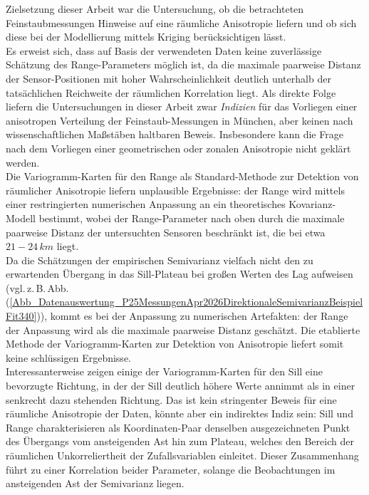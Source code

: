 \label{KapitelDatenauswertung_Diskussion}
Zielsetzung dieser Arbeit war die Untersuchung, ob die betrachteten
Feinstaubmessungen Hinweise auf eine räumliche Anisotropie 
liefern und ob sich diese bei der Modellierung mittels Kriging
berücksichtigen lässt.\\

Es erweist sich, dass auf Basis der verwendeten Daten keine
zuverlässige Schätzung des Range-Parameters möglich ist, da 
die maximale paarweise Distanz der Sensor-Positionen mit hoher
 Wahrscheinlichkeit deutlich unterhalb der tatsächlichen
Reichweite der räum\-li\-chen Korrelation liegt. Als direkte
Folge liefern die Untersuchungen in dieser Arbeit zwar
\textit{Indizien} für das Vorliegen einer anisotropen
Verteilung der Feinstaub-Messungen in München, aber keinen 
nach wissenschaftlichen Maßstäben haltbaren Beweis.
Insbesondere kann die Frage nach dem Vorliegen einer 
 geometrischen oder zonalen Anisotropie nicht geklärt 
 werden. \\

Die Variogramm-Karten für den Range als 
Standard-Methode zur Detektion von räum\-li\-cher Anisotropie 
liefern unplausible Ergebnisse:
der Range wird mittels einer restringierten 
numerischen Anpassung an ein theoretisches 
Kovarianz-Modell bestimmt, wobei der Range-Parameter nach oben 
durch die maximale paarweise Distanz der untersuchten
Sensoren beschränkt ist, die bei etwa $21-24\,k m$ liegt.\\
Da die Schätzungen der empirischen Semivarianz vielfach 
nicht den zu erwartenden Über\-gang in das Sill-Plateau 
bei großen Werten des Lag aufweisen
(vgl.\,z.\,B.\,Abb.\,(\ref{Abb_Datenauswertung_P25MessungenApr2026DirektionaleSemivarianzBeispielFit340})),
kommt es bei der Anpassung zu numerischen Artefakten: der 
Range der Anpassung 
wird als die maximale paarweise Distanz geschätzt.
Die etablierte Methode der Variogramm-Karten zur Detektion von
Anisotropie liefert somit keine schlüssigen Ergebnisse.\\
 
Interessanterweise zeigen einige der Variogramm-Karten für den Sill eine 
bevorzugte Richtung, in der der Sill deutlich höhere Werte annimmt 
als in einer senkrecht dazu stehenden Richtung. 
Das ist kein stringenter Beweis für eine räumliche Anisotropie der Daten, 
könnte aber ein indirektes Indiz sein:
Sill und Range charakterisieren als Koordinaten-Paar denselben
ausgezeichneten Punkt des Übergangs vom ansteigenden
Ast hin zum Plateau, welches den Bereich der räumlichen Unkorreliertheit
der Zufallsvariablen einleitet. Dieser Zusammenhang führt zu einer 
Korrelation beider Parameter, solange 
die Beobachtungen im ansteigenden Ast der Semivarianz liegen. \\

